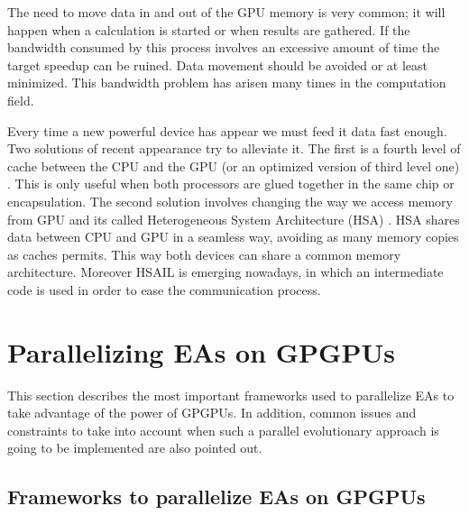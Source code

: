 \documentclass{article}
\begin{document}
The need to move data in and out of the GPU memory is very common; it
will happen when a calculation is started or when results are
gathered. If the bandwidth consumed by this process involves an
excessive amount of time the target speedup can be ruined. Data
movement should be avoided or at least minimized. This bandwidth
problem has arisen many times in the computation field.

Every time a new powerful device has appear we must feed it data fast enough. Two solutions of recent appearance try to alleviate it. The first is a
fourth level of cache between the CPU and the GPU (or an optimized version of third level one) \cite{Li_EAR_2017}. %
This is only useful when both processors are glued together in the same chip or
encapsulation. The second solution involves changing the way we access
memory from GPU and its called Heterogeneous System Architecture
(HSA) \cite{mukherjee2016comprehensive}. %
HSA shares data between CPU and GPU in a seamless way, avoiding
as many memory copies as caches permits. This way both devices can
share a common memory architecture. Moreover HSAIL is emerging nowadays, in which an intermediate code is used in order to ease the communication process.


\section{Parallelizing EAs on GPGPUs}
\label{sec:parallelizing}

This section describes the most important frameworks used to
parallelize EAs to take advantage of the power of GPGPUs. In addition,
common issues and constraints to take into account when such a
parallel evolutionary approach is going to be implemented are also
pointed out.

\subsection{Frameworks to parallelize EAs on GPGPUs}
\end{document}
